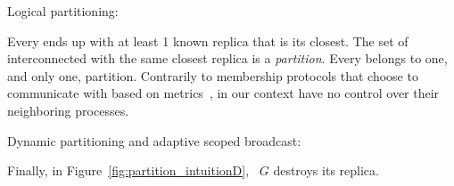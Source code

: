 \begin{asparadesc}
\item [Logical partitioning:]

Every \process ends up with at least 1 known replica that is its
closest. The set of interconnected \processes with the same closest
replica is a \emph{partition}. Every \process belongs to one, and only
one, partition. Contrarily to membership protocols that choose
\processes to communicate with based on metrics~\REF, \processes in
our context have no control over their neighboring processes.

\item [Dynamic partitioning and adaptive scoped broadcast:]

Finally, in Figure~\ref{fig:partition_intuitionD}, \Process~$G$
destroys its replica. 

\end{asparadesc}

  

